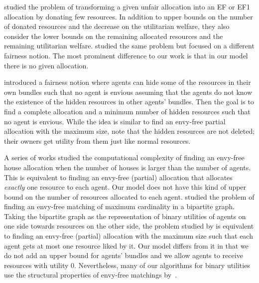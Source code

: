 	\citet{DBLP:journals/aamas/BoehmerBHKL24} studied the problem of transforming a given unfair allocation into an
	EF or EF1 allocation by donating few resources.
	In addition to upper bounds on the number of donated resources and the decrease
	on the utilitarian welfare, they also consider the lower bounds on the remaining
	allocated resources and the remaining utilitarian welfare.
	\citet[Chap 5]{DBLP:journals/algorithmica/DornHS21} studied the same problem but focused
	on a different fairness notion.
	The most prominent difference to our work is that in our model there is no given
	allocation.
	
	\citet{HosseiniSVWX20} introduced a fairness notion where agents can hide some
	of the resources in their own bundles such that no agent is envious assuming
	that the agents do not know the existence of the hidden resources in other agents'
	bundles.  Then the goal is to find a complete allocation and a minimum number of
	hidden resources such that no agent is envious. While the idea is similar to
	find an envy-free partial allocation with the maximum size, note that the hidden
	resources are not deleted; their owners get utility from them just like normal
	resources.
	
	A series of works \cite{GanSV19,BeynierCGHLMW19,KamiyamaMS21} studied the computational complexity of finding an envy-free house allocation when the number of houses is larger than the number of agents.
	This is equivalent to finding an envy-free (partial) allocation that allocates \emph{exactly} one resource to each agent. 
	Our model does not have this kind of upper bound on the number of resources allocated to each agent.
	\citet{aigner2022} studied the problem of finding an envy-free matching of maximum cardinality in a bipartite graph.
	Taking the bipartite graph as the representation of binary utilities of agents on one side towards resources on the other side, the problem studied by \citet{aigner2022} is equivalent to finding an envy-free (partial) allocation with the maximum size such that each agent gets at most one resource liked by it.
	Our model differs from it in that we do not add an upper bound for agents' bundles and we allow agents to receive resources with utility 0.
	Nevertheless, many of our algorithms for binary utilities use the structural
	properties of envy-free matchings %
	by~\citet{aigner2022}.
	
	
	
